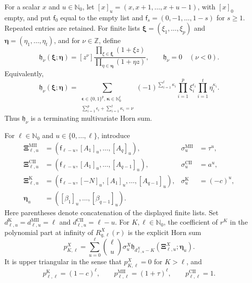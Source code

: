 \documentclass[10pt]{amsart}
\newcommand{\Nzero}{\mathbb N_0}
\theoremstyle{plain}
\theoremstyle{definition}
\theoremstyle{remark}
\begin{document}
For a scalar \(x\) and \(u\in\Nzero\), let
\([x]_u=(x,x+1,\ldots,x+u-1)\), with \([x]_0\) empty, and put
\(\mathsf f_0\) equal to the empty list and
\(\mathsf f_s=(0,-1,\ldots,1-s)\) for \(s\ge1\). Repeated entries are
retained. For finite lists
\(\boldsymbol\xi=(\xi_1,\ldots,\xi_p)\) and
\(\boldsymbol\eta=(\eta_1,\ldots,\eta_t)\), and for
\(\nu\in\mathbb Z\), define
\begin{equation}
 \mathfrak h_\nu(\boldsymbol\xi;\boldsymbol\eta)
 =[z^\nu]\frac{\prod_{\xi\in\boldsymbol\xi}(1+\xi z)}
 {\prod_{\eta\in\boldsymbol\eta}(1+\eta z)},
 \qquad \mathfrak h_\nu=0\quad(\nu<0).
 \label{eq:unreflected-Horn-coefficient}
\end{equation}
Equivalently,
\begin{equation}
 \mathfrak h_\nu(\boldsymbol\xi;\boldsymbol\eta)
 =\sum_{\substack{\boldsymbol\epsilon\in\{0,1\}^{p},
                   \,\boldsymbol\kappa\in\Nzero^{t}\\
                   \sum_{i=1}^p\epsilon_i+\sum_{i=1}^t\kappa_i=\nu}}
 (-1)^{\sum_{i=1}^t\kappa_i}
 \prod_{i=1}^{p}\xi_i^{\epsilon_i}
 \prod_{i=1}^{t}\eta_i^{\kappa_i}.
 \label{eq:unreflected-Horn-finite-sum}
\end{equation}
Thus \(\mathfrak h_\nu\) is a terminating multivariate Horn sum.

For \(\ell\in\Nzero\) and \(u\in\{0,\ldots,\ell\}\), introduce
\begin{align*}
 \boldsymbol\Xi_{\ell,u}^{\mathrm{MII}}
 &=(\mathsf f_{\ell-u},[A_1]_u,\ldots,[A_q]_u),
 &\sigma_u^{\mathrm{MII}}&=\tau^u,\\
 \boldsymbol\Xi_{\ell,u}^{\mathrm{CII}}
 &=(\mathsf f_{\ell-u},[A_1]_u,\ldots,[A_{q-1}]_u),
 &\sigma_u^{\mathrm{CII}}&=a^u,\\
 \boldsymbol\Xi_{\ell,u}^{\mathrm K}
 &=(\mathsf f_{\ell-u},[-N]_u,[A_1]_u,\ldots,[A_{q-1}]_u),
 &\sigma_u^{\mathrm K}&=(-c)^u,\\
 \boldsymbol\eta_u&=([\beta_1]_u,\ldots,[\beta_{q-1}]_u).
\end{align*}
Here parentheses denote concatenation of the displayed finite lists. Set
\(d_{\ell,u}^{\mathrm K}=d_{\ell,u}^{\mathrm{MII}}=\ell\) and
\(d_{\ell,u}^{\mathrm{CII}}=\ell-u\).
For \(K,\ell\in\Nzero\), the coefficient of \(r^K\) in the polynomial part at infinity of
\(R_{q,\ell}^X(r)\) is the explicit Horn sum
\begin{equation}
 p_{K,\ell}^X=
 \sum_{u=0}^{\ell}\binom\ell u\sigma_u^X
 \mathfrak h_{d_{\ell,u}^X-K}
 (\boldsymbol\Xi_{\ell,u}^X;\boldsymbol\eta_u).
 \label{eq:unreflected-infinity-transition}
\end{equation}
It is upper triangular in the sense that \(p_{K,\ell}^X=0\) for
\(K>\ell\), and
\begin{equation}
 p_{\ell,\ell}^{\mathrm K}=(1-c)^\ell,
 \qquad
 p_{\ell,\ell}^{\mathrm{MII}}=(1+\tau)^\ell,
 \qquad
 p_{\ell,\ell}^{\mathrm{CII}}=1.
 \label{eq:unreflected-infinity-pivots}
\end{equation}
\end{document}

